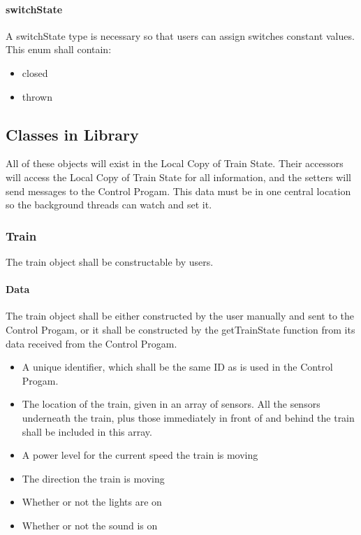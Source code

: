 \documentclass[a4paper,11pt,notitlepage]{article}
\def\CS{Control Progam\xspace} \def\LC{Local Copy of Train State\xspace} \def\TN{Track Node\xspace}
\begin{document}
\paragraph{switchState} A switchState type is necessary so that users can assign switches constant values. This enum shall contain:
\begin{itemize}
\item closed
\item thrown
\end{itemize}
\subsection{Classes in Library}
All of these objects will exist in the \LC. Their accessors will access the \LC for all information, and the setters will send messages to the \CS. This data must be in one central location so the background threads can watch and set it.
\subsubsection{Train}
The train object shall be constructable by users.
\paragraph{Data}
The train object shall be either constructed by the user manually and sent to the \CS, or it shall be constructed by the getTrainState function from its data received from the \CS.
\begin{itemize}
\item A unique identifier, which shall be the same ID as is used in the \CS.
\item The location of the train, given in an array of sensors. All the sensors underneath the train, plus those immediately in front of and behind the train shall be included in this array.
\item A power level for the current speed the train is moving
\item The direction the train is moving
\item Whether or not the lights are on
\item Whether or not the sound is on
\end{itemize}
\end{document}
